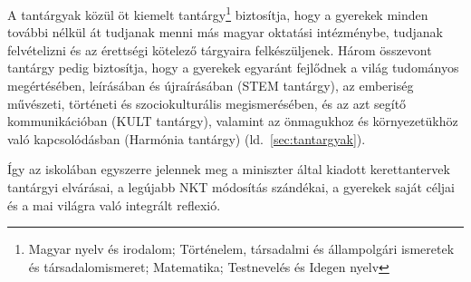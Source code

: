 A tantárgyak közül öt kiemelt tantárgy\footnote{Magyar nyelv és irodalom; Történelem, társadalmi és állampolgári ismeretek és társadalomismeret; Matematika; Testnevelés és Idegen nyelv} biztosítja, hogy a gyerekek minden további nélkül át tudjanak menni más magyar oktatási intézménybe, tudjanak felvételizni és az érettségi kötelező tárgyaira felkészüljenek. Három összevont tantárgy pedig biztosítja, hogy a gyerekek egyaránt fejlődnek a világ tudományos megértésében, leírásában és újraírásában (STEM tantárgy), az emberiség művészeti, történeti és szociokulturális megismerésében, és az azt segítő kommunikáció\-ban (KULT tantárgy), valamint az önmagukhoz és környezetükhöz való kapcsolódásban (Harmónia tantárgy) 
(ld.~\ref{sec:tantargyak}).

Így az iskolában egyszerre jelennek meg a miniszter által kiadott kerettantervek tantárgyi elvárásai, a legújabb NKT módosítás szándékai, a gyerekek saját céljai és a mai világra való integrált reflexió. 
